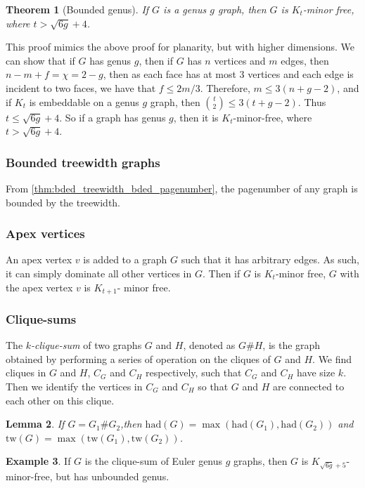\documentclass[]{article}
\newcommand{\tw}{\text{tw}}
\newcommand{\had}{\text{had}}
\newtheorem{theorem}{Theorem}
\newtheorem{lemma}[theorem]{Lemma}
\theoremstyle{definition}
\newtheorem{example}[theorem]{Example}
\numberwithin{theorem}{section}
\numberwithin{equation}{section}
\begin{document}
\begin{theorem}[Bounded genus]\label{thm:bounded_genus_kt_free}
	If $G$ is a genus $g$ graph, then $G$ is $K_t$-minor free, where $t > \sqrt{6g} + 4$. 
\end{theorem}
This proof mimics the above proof for planarity, but with higher dimensions. 
We can show that if $G$ has genus $g$, then if $G$ has $n$ vertices and $m$ edges, then $n - m + f = \chi = 2-g$, then as each face has at most 3 vertices and each edge is incident to two faces, we have that $f \leq 2m/3$. Therefore, $m \leq 3(n + g - 2)$, and if $K_t$ is embeddable on a genus $g$ graph, then $\binom{t}{2} \leq 3 (t + g - 2)$. Thus $t \leq \sqrt{6g} + 4$. So if a graph has genus $g$, then it is $K_t$-minor-free, where $t > \sqrt{6g} + 4$. 

\subsubsection{Bounded treewidth graphs}\label{sssec:Bded_Tw_graph}
From \cref{thm:bded_treewidth_bded_pagenumber}, the pagenumber of any graph is bounded by the treewidth.

\subsubsection{Apex vertices}\label{sssec:Apex_Vertices}
An apex vertex $v$ is added to a graph $G$ such that it has arbitrary edges. As such, it can simply dominate all other vertices in $G$. Then if $G$ is $K_t$-minor free, $G$ with the apex vertex $v$ is $K_{t+1}$- minor free. 
\subsubsection{Clique-sums}\label{sssec:Clique_Sums}
The \textit{$k$-clique-sum} of two graphs $G$ and $H$, denoted as $G \# H$, is the graph obtained by performing a series of operation on the cliques of $G$ and $H$. We find cliques in $G$ and $H$, $C_G$ and $C_H$ respectively, such that $C_G$ and $C_H$ have size $k$. Then we identify the vertices in $C_G$ and $C_H$ so that $G$ and $H$ are connected to each other on this clique. 

\begin{lemma}
	If $G = G_1 \# G_2$,then $\had(G) = \max(\had(G_1), \had(G_2))$ and $\tw(G) = \max(\tw(G_1), \tw(G_2))$.
\end{lemma}

\begin{example}\label{ex:clique_sum_genus}
	If $G$ is the clique-sum of Euler genus $g$ graphs, then $G$ is $K_{\sqrt{6g} + 5}$-minor-free, but has unbounded genus.
\end{example}
\end{document}
